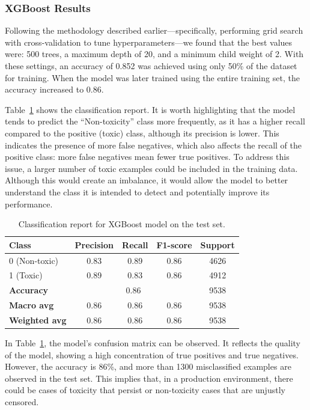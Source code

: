 \subsubsection*{XGBoost Results}

Following the methodology described earlier—specifically, performing grid search with cross-validation to tune hyperparameters—we found that the best values were: 500 trees, a maximum depth of 20, and a minimum child weight of 2. With these settings, an accuracy of 0.852 was achieved using only 50\% of the dataset for training. When the model was later trained using the entire training set, the accuracy increased to 0.86.

Table~\ref{tab:xgboost_classification_report} shows the classification report. It is worth highlighting that the model tends to predict the “Non-toxicity” class more frequently, as it has a higher recall compared to the positive (toxic) class, although its precision is lower. This indicates the presence of more false negatives, which also affects the recall of the positive class: more false negatives mean fewer true positives. To address this issue, a larger number of toxic examples could be included in the training data. Although this would create an imbalance, it would allow the model to better understand the class it is intended to detect and potentially improve its performance.

\begin{table}[htbp]
\centering
\caption{Classification report for XGBoost model on the test set.}
\label{tab:xgboost_classification_report}
\begin{tabular}{lcccc}
\toprule
\textbf{Class} & \textbf{Precision} & \textbf{Recall} & \textbf{F1-score} & \textbf{Support} \\
\midrule
0 (Non-toxic)   & 0.83 & 0.89 & 0.86 & 4626 \\
1 (Toxic)       & 0.89 & 0.83 & 0.86 & 4912 \\
\midrule
\textbf{Accuracy}       & \multicolumn{3}{c}{0.86} & 9538 \\
\textbf{Macro avg}      & 0.86 & 0.86 & 0.86 & 9538 \\
\textbf{Weighted avg}   & 0.86 & 0.86 & 0.86 & 9538 \\
\bottomrule
\end{tabular}
\end{table}

In Table~\ref{tab:xgboost_classification_report}, the model's confusion matrix can be observed. It reflects the quality of the model, showing a high concentration of true positives and true negatives. However, the accuracy is 86\%, and more than 1300 misclassified examples are observed in the test set. This implies that, in a production environment, there could be cases of toxicity that persist or non-toxicity cases that are unjustly censored.

